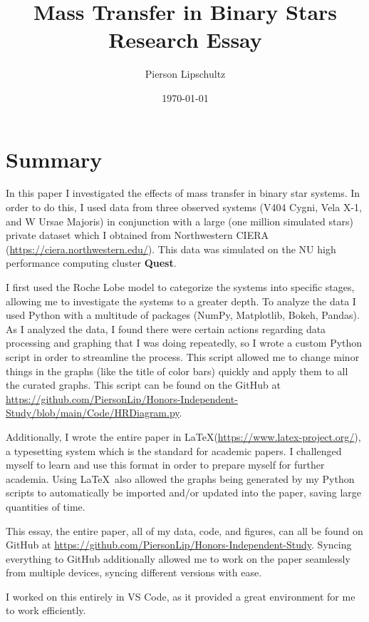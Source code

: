 \documentclass[12pt, a4paper]{article}
\title{Mass Transfer in Binary Stars Research Essay}
\author{Pierson Lipschultz}
\begin{document}
\date{\today}
\maketitle
\section{Summary}
    In this paper I investigated the effects of mass transfer in binary star systems. In order to do this,  I used data from three observed systems (V404 Cygni, Vela X-1, and W Ursae Majoris) in conjunction with a large (one million simulated stars) private dataset which I obtained from Northwestern CIERA (\url{https://ciera.northwestern.edu/}). This data was simulated on the NU high performance computing cluster \textbf{Quest}. 

    I first used the Roche Lobe model to categorize the systems into specific stages, allowing me to investigate the systems to a greater depth. To analyze the data I used Python with a multitude of packages (NumPy, Matplotlib, Bokeh, Pandas). As I analyzed the data, I found there were certain actions regarding data processing and graphing that I was doing repeatedly, so I wrote a custom Python script in order to streamline the process. This script allowed me to change minor things in the graphs (like the title of color bars) quickly and apply them to all the curated graphs. This script can be found on the GitHub at \url{https://github.com/PiersonLip/Honors-Independent-Study/blob/main/Code/HRDiagram.py}.

	Additionally, I wrote the entire paper in \LaTeX (\url{https://www.latex-project.org/}), a typesetting system which is the standard for academic papers. I challenged myself to learn and use this format in order to prepare myself for further academia. Using \LaTeX ~also allowed the graphs being generated by my Python scripts to automatically be imported and/or updated into the paper, saving large quantities of time.

	This essay, the entire paper, all of my data, code, and figures, can all be found on GitHub at \url{https://github.com/PiersonLip/Honors-Independent-Study}. Syncing everything to GitHub additionally allowed me to work on the paper seamlessly from multiple devices, syncing different versions with ease. 

    I worked on this entirely in VS Code, as it provided a great environment for me to work efficiently.
\end{document}
